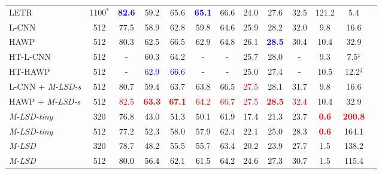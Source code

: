 \documentclass[letterpaper]{article} \usepackage{aaai22}  \usepackage{times}  \usepackage{helvet}  \usepackage{courier}  \usepackage[hyphens]{url}  \usepackage{graphicx} \urlstyle{rm} \def\UrlFont{\rm}  \usepackage{natbib}  \usepackage{caption} \DeclareCaptionStyle{ruled}{labelfont=normalfont,labelsep=colon,strut=off} \frenchspacing  \setlength{\pdfpagewidth}{8.5in}  \setlength{\pdfpageheight}{11in}  \usepackage{algorithm}
\begin{document}
\begin{table*}[t!]
\begin{adjustbox}{width=0.8\textwidth,center}
\begin{tabular}{lcccccccccccc}
LETR~\cite{xu2021line}& 1100$^{\ast}$                    & \textcolor{blue}{\textbf{82.6}}  & 59.2  & 65.6   & \textcolor{blue}{\textbf{65.1}} & 66.6  & 24.0  & 27.6   & 32.5 & 121.2                        & 5.4                 \\
L-CNN~\cite{zhou2019end} & 512                    & 77.5  & 58.9  & 62.8   & 59.8 & 64.6  & 25.9  & 28.2   & 32.0 & 9.8                        & 16.6                 \\
HAWP~\cite{xue2020holistically}& 512                    & 80.3  & 62.5  & 66.5   & 62.9 & 64.8  & 26.1  & \textcolor{blue}{\textbf{28.5}}   & 30.4 & 10.4                       & 32.9                 \\
HT-L-CNN~\cite{lin2020deep}& 512                    & -  & 60.3  & 64.2   & -  & -  & 25.7   & 28.0 & - & 9.3                       & 7.5$^{\ddagger}$                 \\
HT-HAWP~\cite{lin2020deep}& 512                    & -  & \textcolor{blue}{62.9}  & \textcolor{blue}{66.6}   & - & -  & 25.0  & 27.4   & - & 10.5                       & 12.2$^{\ddagger}$                 \\
\midrule
L-CNN + \textit{M-LSD-s} & 512                    & 80.7  & 59.4  & 63.7   & 63.8 & 66.5  & \textcolor{Red}{27.5}  & 28.1   & 31.7 & 9.8                        & 16.6                 \\
HAWP + \textit{M-LSD-s} & 512                    & \textcolor{Red}{82.5}  & \textcolor{Red}{\textbf{63.3}}  & \textcolor{Red}{\textbf{67.1}}   & \textcolor{Red}{64.2} & \textcolor{Red}{66.7}  & \textcolor{Red}{27.5}  & \textcolor{Red}{\textbf{28.5}}   & \textcolor{Red}{32.4} & 10.4                       & 32.9                 \\
\textit{M-LSD-tiny}              & 320                    & 76.8  & 43.0  & 51.3   & 50.1 & 61.9  & 17.4  & 21.3   & 23.7 & \textcolor{Red}{\textbf{0.6}}                        & \textcolor{Red}{\textbf{200.8}}                \\
\textit{M-LSD-tiny}              & 512                    & 77.2  & 52.3  & 58.0   & 57.9 & 62.4  & 22.1  & 25.0   & 28.3 & \textcolor{Red}{\textbf{0.6}}                        & 164.1                \\
\textit{M-LSD}                   & 320                    & 78.7  & 48.2  & 55.5   & 55.7 & 63.4  & 20.2  & 23.9   & 27.7 & 1.5                        & 138.2                \\
\textit{M-LSD}                   & 512                    & \textcolor{Black}{80.0}  & \textcolor{Black}{56.4}  & \textcolor{Black}{62.1}   & \textcolor{Black}{61.5} & \textcolor{Black}{64.2}  & \textcolor{Black}{24.6}  & \textcolor{Black}{27.3}   & \textcolor{Black}{30.7} & 1.5                        & 115.4               \\

\end{tabular}
\end{adjustbox}
\end{table*}
\end{document}
